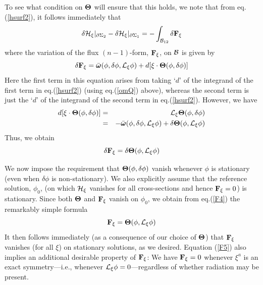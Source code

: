 To see what condition on ${\mbox{\boldmath $\Theta$}}$ will ensure
that this holds, we note that from eq.(\ref{hsurf2}), it
follows immediately that
\begin{equation}
\delta {\cal H}_\xi|_{\partial \Sigma_2} - \delta {\cal
H}_\xi|_{\partial \Sigma_1} = - \int_{{\cal B}_{12}} \delta {\bf
F}_\xi
\label{F1}
\end{equation}
where the variation of the flux $(n-1)$-form, ${\bf F}_\xi$, on ${\cal
B}$ is given by
\begin{equation}
\delta {\bf F}_\xi = \bar{\mbox{\boldmath $\omega$}}(\phi, \delta \phi,
{\cal L}_\xi \phi) + d [\xi \cdot {\mbox{\boldmath $\Theta$}}(\phi,
\delta \phi)]
\label{F2}
\end{equation}
Here the first term in this equation arises from taking `$d$'
of the integrand of the first term in eq.(\ref{hsurf2}) (using
eq.(\ref{omQ}) above), whereas the second term is just the `$d$'
of the integrand of the second term in eq.(\ref{hsurf2}). 
However, we have
\begin{eqnarray}
d [\xi \cdot {\mbox{\boldmath $\Theta$}}(\phi, \delta \phi)] & = & {\cal
L}_\xi {\mbox{\boldmath $\Theta$}}(\phi, \delta \phi) \nonumber \\ 
& = & - \bar{\mbox{\boldmath $\omega$}}(\phi, \delta \phi, {\cal L}_\xi \phi)
+ \delta {\mbox{\boldmath $\Theta$}}(\phi,{\cal L}_\xi \phi)
\label{F3}
\end{eqnarray}
Thus, we obtain
\begin{equation}
\delta {\bf F}_\xi = \delta {\mbox{\boldmath $\Theta$}}(\phi,{\cal L}_\xi \phi)
\label{F4}
\end{equation}

We now impose the requirement that ${\mbox{\boldmath $\Theta$}}(\phi,
\delta \phi)$ vanish whenever $\phi$ is stationary (even when $\delta
\phi$ is non-stationary). We also explicitly assume that the reference
solution, $\phi_0$, (on which ${\cal H}_\xi$ vanishes for all cross-sections
and hence ${\bf F}_\xi = 0$) is stationary. Since both
${\mbox{\boldmath $\Theta$}}$ and ${\bf F}_\xi$ vanish on $\phi_0$, we
obtain from eq.(\ref{F4}) the remarkably simple formula
\begin{equation}
{\bf F}_\xi = {\mbox{\boldmath $\Theta$}}(\phi,{\cal L}_\xi \phi)
\label{F5}
\end{equation}
It then follows immediately (as a consequence of our choice of
${\mbox{\boldmath $\Theta$}}$) that ${\bf F}_\xi$ vanishes (for all
$\xi$) on stationary solutions, as we desired. Equation (\ref{F5})
also implies an additional desirable property of ${\bf F}_\xi$: We
have ${\bf F}_\xi = 0$ whenever $\xi^a$ is an exact symmetry---i.e.,
whenever ${\cal L}_\xi \phi = 0$---regardless of whether radiation may
be present.

